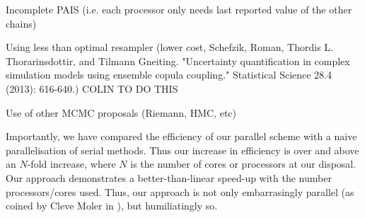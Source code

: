 \documentclass[final]{siamltex}
\begin{document}
Incomplete PAIS (i.e. each processor only needs last reported value of
the other chains)

Using less than optimal resampler (lower cost, Schefzik, Roman,
Thordis L. Thorarinsdottir, and Tilmann Gneiting. "Uncertainty
quantification in complex simulation models using ensemble copula
coupling." Statistical Science 28.4 (2013): 616-640.) COLIN TO DO THIS

Use of other MCMC proposals (Riemann, HMC, etc)

Importantly, we have compared the efficiency of our parallel scheme
with a naive parallelisation of serial methods. Thus our increase in
efficiency is over and above an $N$-fold increase, where $N$ is the
number of cores or processors at our disposal. Our approach
demonstrates a better-than-linear speed-up with the number
processors/cores used. Thus, our approach is not only embarrasingly
parallel (as coined by Cleve Moler in \cite{moler1986matrix}), but
humiliatingly so.




\end{document}
